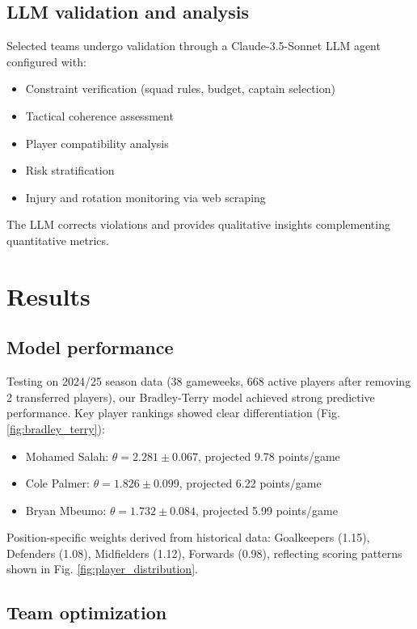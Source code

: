 \documentclass[10pt,a4paper,twocolumn]{article}
\begin{document}
\subsection*{LLM validation and analysis}

Selected teams undergo validation through a Claude-3.5-Sonnet LLM agent configured with:

\begin{itemize}
\item Constraint verification (squad rules, budget, captain selection)
\item Tactical coherence assessment
\item Player compatibility analysis
\item Risk stratification
\item Injury and rotation monitoring via web scraping
\end{itemize}

The LLM corrects violations and provides qualitative insights complementing quantitative metrics.

\section*{Results}

\subsection*{Model performance}

Testing on 2024/25 season data (38 gameweeks, 668 active players after removing 2 transferred players), our Bradley-Terry model achieved strong predictive performance. Key player rankings showed clear differentiation (Fig. \ref{fig:bradley_terry}):

\begin{itemize}
\item Mohamed Salah: $\theta = 2.281 \pm 0.067$, projected 9.78 points/game
\item Cole Palmer: $\theta = 1.826 \pm 0.099$, projected 6.22 points/game  
\item Bryan Mbeumo: $\theta = 1.732 \pm 0.084$, projected 5.99 points/game
\end{itemize}

Position-specific weights derived from historical data: Goalkeepers (1.15), Defenders (1.08), Midfielders (1.12), Forwards (0.98), reflecting scoring patterns shown in Fig. \ref{fig:player_distribution}.

\subsection*{Team optimization}
\end{document}
